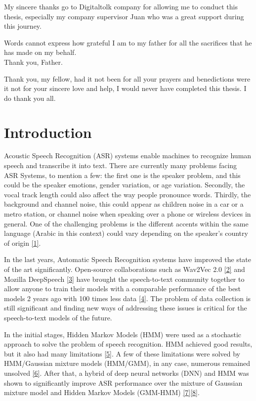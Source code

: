 \documentclass[
  a4paper,
]{article}
\begin{document}
My sincere thanks go to Digitaltolk company for allowing me to conduct
this thesis, especially my company supervisor Juan who was a great
support during this journey.

Words cannot express how grateful I am to my father for all the
sacrifices that he has made on my behalf.\\
Thank you, Father.

Thank you, my fellow, had it not been for all your prayers and
benedictions were it not for your sincere love and help, I would never
have completed this thesis. I do thank you all.

\newpage


\hypertarget{introduction}{%
\section{Introduction}\label{introduction}}

\noindent

Acoustic Speech Recognition (ASR) systems enable machines to recognize
human speech and transcribe it into text. There are currently many
problems facing ASR Systems, to mention a few: the first one is the
speaker problem, and this could be the speaker emotions, gender
variation, or age variation. Secondly, the vocal track length could also
affect the way people pronounce words. Thirdly, the background and
channel noise, this could appear as children noise in a car or a metro
station, or channel noise when speaking over a phone or wireless devices
in general. One of the challenging problems is the different accents
within the same language (Arabic in this context) could vary depending
on the speaker's country of origin
\protect\hyperlink{ref-shrawankar2013adverse}{{[}1{]}}.

In the last years, Automatic Speech Recognition systems have improved
the state of the art significantly. Open-source collaborations such as
Wav2Vec 2.0 \protect\hyperlink{ref-2020arXiv200611477B}{{[}2{]}} and
Mozilla DeepSpeech \protect\hyperlink{ref-hannun2014deep}{{[}3{]}} have
brought the speech-to-text community together to allow anyone to train
their models with a comparable performance of the best models 2 years
ago with 100 times less data \protect\hyperlink{ref-Mozilla}{{[}4{]}}.
The problem of data collection is still significant and finding new ways
of addressing these issues is critical for the speech-to-text models of
the future.

In the initial stages, Hidden Markov Models (HMM) were used as a
stochastic approach to solve the problem of speech recognition. HMM
achieved good results, but it also had many limitations
\protect\hyperlink{ref-hmm}{{[}5{]}}. A few of these limitations were
solved by HMM/Gaussian mixture models (HMM/GMM), in any case, numerous
remained unsolved \protect\hyperlink{ref-1369308}{{[}6{]}}. After that,
a hybrid of deep neural networks (DNN) and HMM was shown to
significantly improve ASR performance over the mixture of Gaussian
mixture model and Hidden Markov Models (GMM-HMM)
\protect\hyperlink{ref-6681449}{{[}7{]}}\protect\hyperlink{ref-6854824}{{[}8{]}}.
\end{document}
